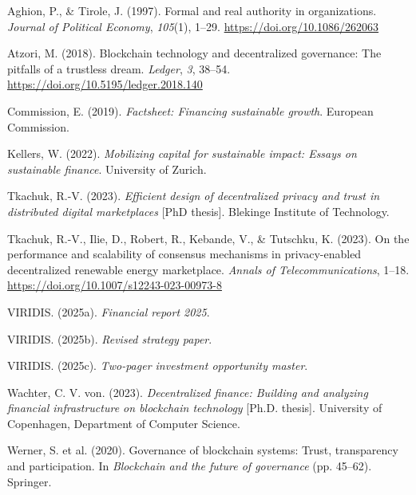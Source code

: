 \documentclass[
  english,
  12pt,
  oneside,
  open=any]{scrbook}
\newlength{\cslhangindent}
\newenvironment{CSLReferences}[2] %
 {\begin{list}{}{%
  \setlength{\itemindent}{0pt}
  \setlength{\leftmargin}{0pt}
  \setlength{\parsep}{0pt}
  \ifodd #1
   \setlength{\leftmargin}{\cslhangindent}
   \setlength{\itemindent}{-1\cslhangindent}
  \fi
  \setlength{\itemsep}{#2\baselineskip}}}
 {\end{list}}
\begin{document}
\label{refs}
\begin{CSLReferences}{1}{0}
Aghion, P., \& Tirole, J. (1997). Formal and real authority in
organizations. \emph{Journal of Political Economy}, \emph{105}(1),
1--29. \url{https://doi.org/10.1086/262063}

Atzori, M. (2018). Blockchain technology and decentralized governance:
The pitfalls of a trustless dream. \emph{Ledger}, \emph{3}, 38--54.
\url{https://doi.org/10.5195/ledger.2018.140}

Commission, E. (2019). \emph{Factsheet: Financing sustainable growth}.
European Commission.

Kellers, W. (2022). \emph{Mobilizing capital for sustainable impact:
Essays on sustainable finance}. University of Zurich.

Tkachuk, R.-V. (2023). \emph{Efficient design of decentralized privacy
and trust in distributed digital marketplaces} {[}PhD thesis{]}.
Blekinge Institute of Technology.

Tkachuk, R.-V., Ilie, D., Robert, R., Kebande, V., \& Tutschku, K.
(2023). On the performance and scalability of consensus mechanisms in
privacy-enabled decentralized renewable energy marketplace. \emph{Annals
of Telecommunications}, 1--18.
\url{https://doi.org/10.1007/s12243-023-00973-8}

VIRIDIS. (2025a). \emph{Financial report 2025}.

VIRIDIS. (2025b). \emph{Revised strategy paper}.

VIRIDIS. (2025c). \emph{Two-pager investment opportunity master}.

Wachter, C. V. von. (2023). \emph{Decentralized finance: Building and
analyzing financial infrastructure on blockchain technology} {[}Ph.D.
thesis{]}. University of Copenhagen, Department of Computer Science.

Werner, S. et al. (2020). Governance of blockchain systems: Trust,
transparency and participation. In \emph{Blockchain and the future of
governance} (pp. 45--62). Springer.

\end{CSLReferences}


\backmatter
\end{document}
